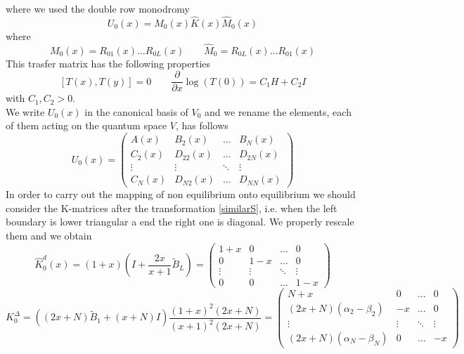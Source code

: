 \documentclass[11pt]{article}
\numberwithin{equation}{section}
\numberwithin{equation}{subsection}
\begin{document}
where we used the double row monodromy
\begin{equation}
	U_{0}(x)=M_{0}(x)\widehat{K}(x)\widehat{M}_{0}(x)
\end{equation}
where 
\begin{equation}
	M_{0}(x)=R_{01}(x)\ldots R_{0L}(x)\qquad \widehat{M}_{0}=R_{0L}(x)\ldots R_{01}(x)
\end{equation}
This trasfer matrix has the following properties
\begin{equation}
	\left[T(x),T(y)\right]=0\qquad \frac{\partial}{\partial x}\log (T(0))=C_{1}H+C_{2}I
\end{equation}
with $C_{1},C_{2}>0$. \\
We write $U_{0}(x)$ in the canonical basis of $V_{0}$ and we rename the elements, each of them acting on the quantum space $V$, has follows
\begin{equation}
	U_{0}(x)=\begin{pmatrix}
		A(x)&B_{2}(x)&\ldots&B_{N}(x)\\
		C_{2}(x)&D_{22}(x)&\ldots&D_{2N}(x)\\
		\vdots&\vdots&\ddots&\vdots\\
		C_{N}(x)&D_{N2}(x)&\ldots&D_{NN}(x)
	\end{pmatrix}
\end{equation}
In order to carry out the mapping of non equilibrium onto equilibrium we should consider the K-matrices after the transformation \eqref{similarS}, i.e. when the left boundary is lower triangular a end the right one is diagonal. We properly rescale them and we obtain
\begin{equation}
	\widehat{K}_{0}^{d}(x)=(1+x)\left(I+\frac{2x}{x+1}\widetilde{B}_{L}\right)=\begin{pmatrix}
		1+x&0&\ldots&0\\
		0&1-x&\ldots&0\\
		\vdots&\vdots&\ddots&\vdots\\
		0&0&\ldots&1-x
	\end{pmatrix}
\end{equation}
\begin{equation}
	K_{0}^{\Delta}=\left((2x+N)\widetilde{B}_{1}+(x+N)I\right)\frac{(1+x)^{2}(2x+N)}{(x+1)^{2}(2x+N)}=\begin{pmatrix}
		N+x&0&\ldots&0\\
		(2x+N)(\alpha_{2}-\beta_{2})&-x&\ldots&0\\
		\vdots&\vdots&\ddots&\vdots\\
		(2x+N)(\alpha_{N}-\beta_{N})&0&\ldots&-x
	\end{pmatrix}
\end{equation}
\end{document}
